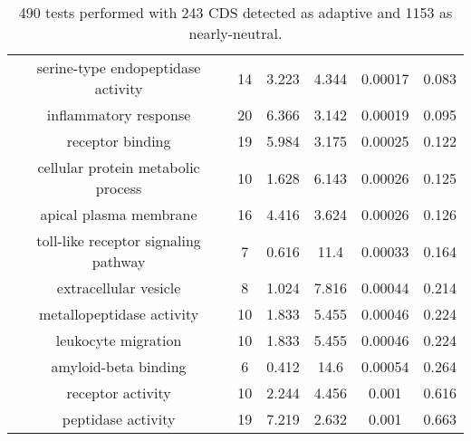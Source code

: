 \documentclass[USLetter,5pt]{article}
\begin{document}
\begin{table}[ht]
\begin{adjustbox}{width = 1\textwidth}
\begin{tabular}{|c|c|c|c|c|c|}
serine-type endopeptidase activity & 14 &  3.223 &  4.344 & 0.00017 &  0.083\\
inflammatory response & 20 &  6.366 &  3.142 & 0.00019 &  0.095\\
receptor binding & 19 &  5.984 &  3.175 & 0.00025 &  0.122\\
cellular protein metabolic process & 10 &  1.628 &  6.143 & 0.00026 &  0.125\\
apical plasma membrane & 16 &  4.416 &  3.624 & 0.00026 &  0.126\\
toll-like receptor signaling pathway & 7 &  0.616 &   11.4 & 0.00033 &  0.164\\
extracellular vesicle & 8 &  1.024 &  7.816 & 0.00044 &  0.214\\
metallopeptidase activity & 10 &  1.833 &  5.455 & 0.00046 &  0.224\\
leukocyte migration & 10 &  1.833 &  5.455 & 0.00046 &  0.224\\
amyloid-beta binding & 6 &  0.412 &   14.6 & 0.00054 &  0.264\\
receptor activity & 10 &  2.244 &  4.456 &  0.001 &  0.616\\
peptidase activity & 19 &  7.219 &  2.632 &  0.001 &  0.663\\
\hline
\end{tabular}
\end{adjustbox}
\caption{490 tests performed with 243 CDS detected as adaptive and 1153 as nearly-neutral.
}
\end{table}
\end{document}
